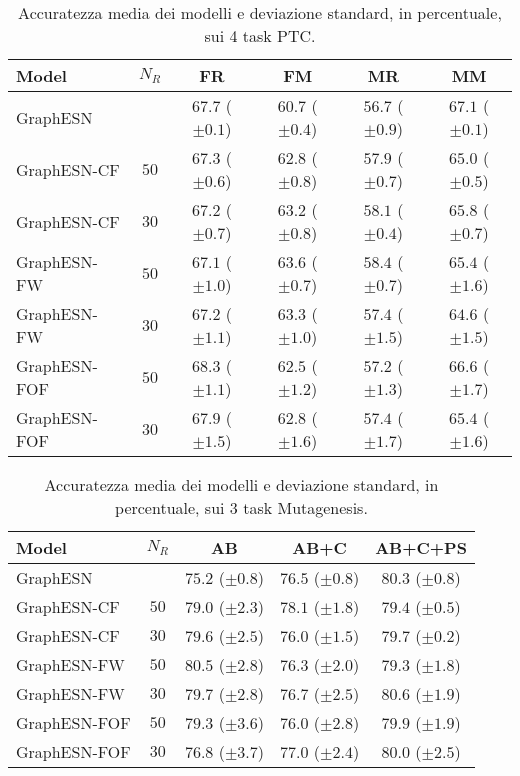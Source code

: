 \documentclass[10pt,a4paper]{book}
\begin{document}
\begin{table}[tbp]
\small
\caption{Accuratezza media dei modelli e deviazione standard, in percentuale, sui 4 task PTC.}
\label{tab:esperimenti:ptc}
\centering	
\begin{tabular}{l*{5}{c}}
\toprule
Model 		& $N_R$	& FR				 & FM				  & MR				   & MM	\\
\midrule
GraphESN 	& 	    & $67.7$ ($\pm 0.1$) & $60.7$ ($\pm 0.4$) & $56.7$ ($\pm 0.9$) & $67.1$ ($\pm 0.1$) \\
GraphESN-CF & $50$  & $67.3$ ($\pm 0.6$) & $62.8$ ($\pm 0.8$) & $57.9$ ($\pm 0.7$) & $65.0$ ($\pm 0.5$) \\
GraphESN-CF & $30$  & $67.2$ ($\pm 0.7$) & $63.2$ ($\pm 0.8$) & $58.1$ ($\pm 0.4$) & $65.8$ ($\pm 0.7$) \\
GraphESN-FW & $50$  & $67.1$ ($\pm 1.0$) & $63.6$ ($\pm 0.7$) & $58.4$ ($\pm 0.7$) & $65.4$ ($\pm 1.6$) \\
GraphESN-FW & $30$  & $67.2$ ($\pm 1.1$) & $63.3$ ($\pm 1.0$) & $57.4$ ($\pm 1.5$) & $64.6$ ($\pm 1.5$) \\
GraphESN-FOF & $50$ & $68.3$ ($\pm 1.1$) & $62.5$ ($\pm 1.2$) & $57.2$ ($\pm 1.3$) & $66.6$ ($\pm 1.7$) \\
GraphESN-FOF & $30$ & $67.9$ ($\pm 1.5$) & $62.8$ ($\pm 1.6$) & $57.4$ ($\pm 1.7$) & $65.4$ ($\pm 1.6$) \\
\bottomrule
\end{tabular}
\end{table}


\begin{table}[tbp]
\small
\caption[Accuratezza media su Mutagenesis]{Accuratezza media dei modelli e deviazione standard, in percentuale, sui 3 task Mutagenesis.}
\label{tab:esperimenti:mutag} 
\centering	
\begin{tabular}{l*{4}{c}}
\toprule
Model 		 & $N_R$& AB				  & AB+C			   & AB+C+PS	\\
\midrule
GraphESN 	 & 		& $75.2$ ($\pm 0.8$) & $76.5$ ($\pm 0.8$) & $80.3$ ($\pm 0.8$) \\
GraphESN-CF  & $50$ & $79.0$ ($\pm 2.3$) & $78.1$ ($\pm 1.8$) & $79.4$ ($\pm 0.5$) \\
GraphESN-CF  & $30$ & $79.6$ ($\pm 2.5$) & $76.0$ ($\pm 1.5$) & $79.7$ ($\pm 0.2$) \\
GraphESN-FW  & $50$ & $80.5$ ($\pm 2.8$) & $76.3$ ($\pm 2.0$) & $79.3$ ($\pm 1.8$) \\
GraphESN-FW  & $30$ & $79.7$ ($\pm 2.8$) & $76.7$ ($\pm 2.5$) & $80.6$ ($\pm 1.9$) \\
GraphESN-FOF & $50$ & $79.3$ ($\pm 3.6$) & $76.0$ ($\pm 2.8$) & $79.9$ ($\pm 1.9$) \\
GraphESN-FOF & $30$ & $76.8$ ($\pm 3.7$) & $77.0$ ($\pm 2.4$) & $80.0$ ($\pm 2.5$) \\
\bottomrule
\end{tabular}
\end{table}
\end{document}

